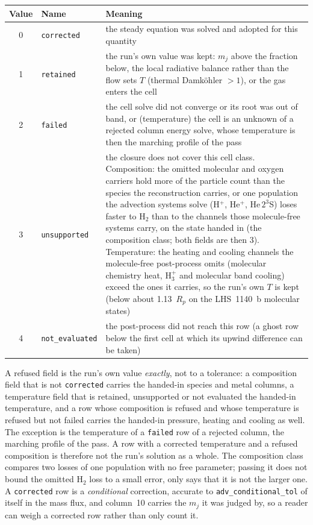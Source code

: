 \documentclass[english,a4paper]{my_memo}
\begin{document}
\begin{center}\small
\begin{tabular}{@{}cl>{\raggedright\arraybackslash}p{}@{}}
\toprule
Value & Name & Meaning \\
\midrule
0 & \texttt{corrected} & the steady equation was solved and adopted for this quantity \\
1 & \texttt{retained} & the run's own value was kept: $m_j$ above the fraction below, the
   local radiative balance rather than the flow sets $T$ (thermal Damk\"ohler $>1$), or
   the gas enters the cell \\
2 & \texttt{failed} & the cell solve did not converge or its root was out of band,
   or (temperature) the cell is an unknown of a rejected column energy solve,
   whose temperature is then the marching profile of the pass \\
3 & \texttt{unsupported} & the closure does not cover this cell class. Composition:
   the omitted molecular and oxygen carriers hold more of the particle count than the
   species the reconstruction carries, or one population the advection systems solve
   (H$^+$, He$^+$, He\,$2^3$S) loses faster to H$_2$ than to the channels those
   molecule-free systems carry, on the state handed in (the composition class; both
   fields are then 3). Temperature: the heating and cooling channels the
   molecule-free post-process omits (molecular chemistry heat, H$_3^+$ and molecular band
   cooling) exceed the ones it carries, so the run's own $T$ is kept (below about
   1.13~$R_p$ on the LHS~1140~b molecular states) \\
4 & \texttt{not\_evaluated} & the post-process did not reach this row (a ghost row below
   the first cell at which its upwind difference can be taken) \\
\bottomrule
\end{tabular}
\end{center}

\noindent A refused field is the run's own value \emph{exactly}, not to a tolerance:
a composition field that is not \texttt{corrected} carries the handed-in species and metal
columns, a temperature field that is retained, unsupported or not evaluated the handed-in
temperature, and a row whose composition is refused and whose temperature is refused but
not failed carries the handed-in pressure, heating and cooling as well. The exception is the
temperature of a \texttt{failed} row of a rejected column, the marching profile of the
pass. A row with a corrected temperature and a refused composition is therefore not the
run's solution as a whole. The composition class compares two losses of one population
with no free parameter; passing it does not bound the omitted H$_2$ loss to a small
error, only says that it is not the larger one. A \texttt{corrected} row is a \emph{conditional}
correction, accurate to \texttt{adv\_conditional\_tol} of itself in the mass flux, and
column~10 carries the $m_j$ it was judged by, so a reader can weigh a corrected row rather
than only count it.
\end{document}
